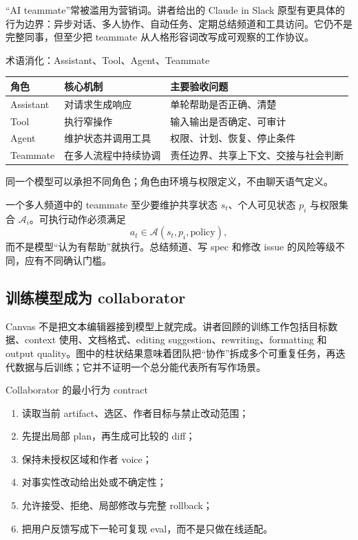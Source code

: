 “AI teammate”常被滥用为营销词。讲者给出的 Claude in Slack 原型有更具体的行为边界：异步对话、多人协作、自动任务、定期总结频道和工具访问。它仍不是完整同事，但至少把 teammate 从人格形容词改写成可观察的工作协议。


\begin{knowledgebox}{术语消化：Assistant、Tool、Agent、Teammate}
\begin{tabularx}{\textwidth}{L{0.17\textwidth} X X}
\toprule
角色 & 核心机制 & 主要验收问题 \\
\midrule
Assistant & 对请求生成响应 & 单轮帮助是否正确、清楚 \\
Tool & 执行窄操作 & 输入输出是否确定、可审计 \\
Agent & 维护状态并调用工具 & 权限、计划、恢复、停止条件 \\
Teammate & 在多人流程中持续协调 & 责任边界、共享上下文、交接与社会判断 \\
\bottomrule
\end{tabularx}
同一个模型可以承担不同角色；角色由环境与权限定义，不由聊天语气定义。
\end{knowledgebox}

一个多人频道中的 teammate 至少要维护共享状态 $s_t$、个人可见状态 $p_i$ 与权限集合 $\mathcal{A}_i$。可执行动作必须满足
\[
a_t\in \mathcal{A}(s_t,p_i,\text{policy}),
\]
而不是模型“认为有帮助”就执行。总结频道、写 spec 和修改 issue 的风险等级不同，应有不同确认门槛。

\subsection{训练模型成为 collaborator}

Canvas 不是把文本编辑器接到模型上就完成。讲者回顾的训练工作包括目标数据、context 使用、文档格式、editing suggestion、rewriting、formatting 和 output quality。图中的柱状结果意味着团队把“协作”拆成多个可重复任务，再迭代数据与后训练；它并不证明一个总分能代表所有写作场景。



\begin{importantbox}{Collaborator 的最小行为 contract}
\begin{enumerate}
  \item 读取当前 artifact、选区、作者目标与禁止改动范围；
  \item 先提出局部 plan，再生成可比较的 diff；
  \item 保持未授权区域和作者 voice；
  \item 对事实性改动给出处或不确定性；
  \item 允许接受、拒绝、局部修改与完整 rollback；
  \item 把用户反馈写成下一轮可复现 eval，而不是只做在线适配。
\end{enumerate}
\end{importantbox}

